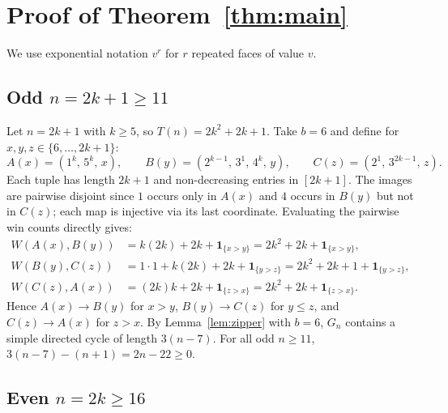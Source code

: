 \documentclass[11pt]{article}
\begin{document}
\section{Proof of Theorem~\ref{thm:main}}

We use exponential notation $v^r$ for $r$ repeated faces of value $v$.

\subsection{Odd $n = 2k + 1 \ge 11$}

Let $n = 2k + 1$ with $k \ge 5$, so $T(n) = 2k^2 + 2k + 1$. Take $b = 6$ and define for $x, y, z \in \{6,\dots,2k+1\}$:
\[
  A(x) = (1^k,\, 5^k,\, x), \qquad
  B(y) = (2^{k-1},\, 3^1,\, 4^k,\, y), \qquad
  C(z) = (2^1,\, 3^{2k-1},\, z).
\]
Each tuple has length $2k+1$ and non-decreasing entries in $[2k+1]$. The images are pairwise disjoint since $1$ occurs only in $A(x)$ and $4$ occurs in $B(y)$ but not in $C(z)$; each map is injective via its last coordinate. Evaluating the pairwise win counts directly gives:
\begin{align*}
  W(A(x), B(y)) &= k(2k) + 2k + \mathbf{1}_{\{x > y\}} = 2k^2 + 2k + \mathbf{1}_{\{x > y\}}, \\
  W(B(y), C(z)) &= 1\cdot 1 + k(2k) + 2k + \mathbf{1}_{\{y > z\}} = 2k^2 + 2k + 1 + \mathbf{1}_{\{y > z\}}, \\
  W(C(z), A(x)) &= (2k)k + 2k + \mathbf{1}_{\{z > x\}} = 2k^2 + 2k + \mathbf{1}_{\{z > x\}}.
\end{align*}
Hence $A(x) \to B(y)$ for $x > y$, $B(y) \to C(z)$ for $y \le z$, and $C(z) \to A(x)$ for $z > x$. By Lemma~\ref{lem:zipper} with $b = 6$, $G_n$ contains a simple directed cycle of length $3(n - 7)$. For all odd $n \ge 11$, $3(n - 7) - (n + 1) = 2n - 22 \ge 0$.

\subsection{Even $n = 2k \ge 16$}
\end{document}

